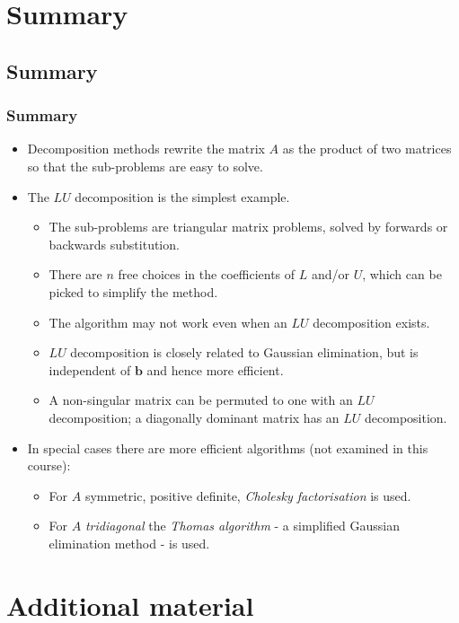 \documentclass{beamer}
\newcommand{\bb}{{\boldsymbol{b}}}
\begin{document}
\section{Summary}

\subsection{Summary}

\begin{frame}
  \frametitle{Summary}
  
  \begin{itemize}
  \item Decomposition methods rewrite the matrix $A$ as the product of
    two matrices so that the sub-problems are easy to solve.
  \item The $LU$ decomposition is the simplest example.
    \begin{itemize}
    \item The sub-problems are triangular matrix problems, solved by
      forwards or backwards substitution.
    \item There are $n$ free choices in the coefficients of $L$ and/or
      $U$, which can be picked to simplify the method.
    \item The algorithm may not work even when an $LU$ decomposition
      exists.
    \item $LU$ decomposition is closely related to Gaussian
      elimination, but is independent of $\bb$ and hence more
      efficient.
    \item A non-singular matrix can be permuted to one with an $LU$
      decomposition; a diagonally dominant matrix has an $LU$
      decomposition. 
    \end{itemize}
  \item In special cases there are more efficient algorithms (not
    examined in this course):
    \begin{itemize}
    \item For $A$ symmetric, positive definite, \emph{Cholesky
        factorisation} is used.
    \item For $A$ \emph{tridiagonal} the \emph{Thomas algorithm} - a
      simplified Gaussian elimination method - is used.
    \end{itemize}
  \end{itemize}
   
\end{frame}


\section{Additional material}
\end{document}
